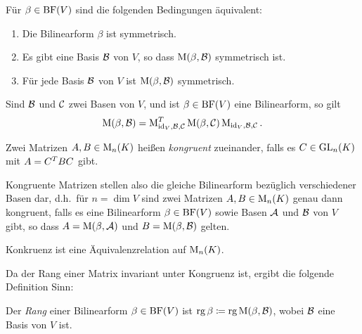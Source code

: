 \begin{lemma}
  Für $\beta \in \operatorname{BF}(V)$ sind die folgenden Bedingungen äquivalent:
  \begin{enumerate}
    \item
      Die Bilinearform $\beta$ ist symmetrisch.
    \item
      Es gibt eine Basis $\mathcal{B}$ von $V$, so dass $\operatorname{M}(\beta, \mathcal{B})$ symmetrisch ist.
    \item
      Für jede Basis $\mathcal{B}$ von $V$ ist $\operatorname{M}(\beta, \mathcal{B})$ symmetrisch.
  \end{enumerate}
\end{lemma}

\begin{lemma}
  Sind $\mathcal{B}$ und $\mathcal{C}$ zwei Basen von $V$, und ist $\beta \in \operatorname{BF}(V)$ eine Bilinearform, so gilt
  \[
      \operatorname{M}(\beta, \mathcal{B})
    = \operatorname{M}_{\operatorname{id}_V, \mathcal{B}, \mathcal{C}}^T
      \operatorname{M}(\beta, \mathcal{C})
      \operatorname{M}_{\operatorname{id}_V, \mathcal{B}, \mathcal{C}}.
  \]
\end{lemma}

\begin{definition}
  Zwei Matrizen $A, B \in \operatorname{M}_{n}(K)$ heißen \emph{kongruent} zueinander, falls es $C \in \operatorname{GL}_{n}(K)$ mit $A = C^T B C$ gibt.
\end{definition}

Kongruente Matrizen stellen also die gleiche Bilinearform bezüglich verschiedener Basen dar, d.h.\ für $n = \dim V$ sind zwei Matrizen $A, B \in \operatorname{M}_{n}(K)$ genau dann kongruent, falls es eine Bilinearform $\beta \in \operatorname{BF}(V)$ sowie Basen $\mathcal{A}$ und $\mathcal{B}$ von $V$ gibt, so dass $A = \operatorname{M}(\beta, \mathcal{A})$ und $B = \operatorname{M}(\beta, \mathcal{B})$ gelten.

\begin{corollary}
  Konkruenz ist eine Äquivalenzrelation auf $\operatorname{M}_{n}(K)$.
\end{corollary}

Da der Rang einer Matrix invariant unter Kongruenz ist, ergibt die folgende Definition Sinn:

\begin{definition}
  Der \emph{Rang} einer Bilinearform $\beta \in \operatorname{BF}(V)$ ist $\operatorname{rg} \beta \coloneqq \operatorname{rg} \operatorname{M}(\beta, \mathcal{B})$, wobei $\mathcal{B}$ eine Basis von $V$ ist.
\end{definition}





